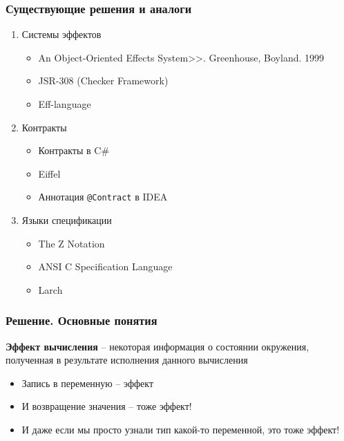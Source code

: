 \documentclass{beamer}
\newcommand{\code}[1]{\texttt{#1}}
\begin{document}
\begin{frame}[fragile]\frametitle{Существующие решения и аналоги}
    \begin{enumerate}
        \item Системы эффектов
        
            \begin{itemize}
                \item \text{<<}An Object-Oriented Effects System>>. Greenhouse, Boyland. 1999
                \item JSR-308 (Checker Framework)
                \item Eff-language
            \end{itemize}
            
        \item Контракты
        
            \begin{itemize}
                \item Контракты в C\#      
                \item Eiffel
                \item Аннотация \code{@Contract} в IDEA
            \end{itemize}
        
        \item Языки спецификации
            
            \begin{itemize}
                \item The Z Notation                
                \item ANSI C Specification Language                
                \item Larch
            \end{itemize}
    \end{enumerate}
\end{frame}

\begin{frame}\frametitle{Решение. Основные понятия}
    \begin{definition}
        \textbf{Эффект вычисления} -- некоторая информация о состоянии окружения, полученная в результате исполнения данного вычисления
    \end{definition}
    
    \begin{itemize}
        \item Запись в переменную -- эффект
        \item И возвращение значения -- тоже эффект!
        \item И даже если мы просто узнали тип какой-то переменной, это тоже эффект!
    \end{itemize}
\end{frame}
\end{document}
